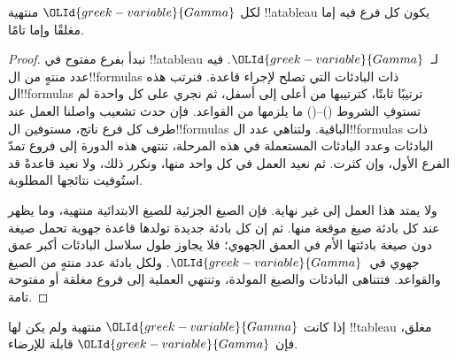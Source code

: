 \documentclass[../../../include/open-logic-section]{subfiles}
\begin{document}
\begin{prop}
  لكل ${\OLId{greek-variable}{Gamma}}$ منتهية !!a{tableau} يكون كل فرع فيه إما مغلقًا وإما تامًا.
\end{prop}

\begin{proof}
  نبدأ بفرع مفتوح في !!a{tableau} لـ~${\OLId{greek-variable}{Gamma}}$.
  فيه عدد منتهٍ من ال!!{formula}s ذات البادئات التي تصلح لإجراء
  قاعدة. فنرتب هذه ال!!{formula}s ترتيبًا ثابتًا، كترتيبها من أعلى
  إلى أسفل، ثم نجري على كل واحدة لم تستوفِ الشروط ()--() ما
  يلزمها من القواعد. فإن حدث تشعيب واصلنا العمل عند طرف كل فرع
  ناتج، مستوفين ال!!{formula}s الباقية. ولتناهي عدد ال!!{formula}s
  ذات البادئات وعدد البادئات المستعملة في هذه المرحلة، تنتهي هذه
  الدورة إلى فروع تمدّ الفرع الأول، وإن كثرت. ثم نعيد العمل في كل
  واحد منها، ونكرر ذلك، ولا نعيد قاعدةً قد استُوفيت نتائجها المطلوبة.

  ولا يمتد هذا العمل إلى غير نهاية. فإن الصيغ الجزئية للصيغ الابتدائية
  منتهية، وما يظهر عند كل بادئة صيغ موقعة منها. ثم إن كل بادئة جديدة
  تولدها قاعدة جهوية تحمل صيغة دون صيغة بادئتها الأم في العمق الجهوي؛
  فلا يجاوز طول سلاسل البادئات أكبر عمق جهوي في~${\OLId{greek-variable}{Gamma}}$. ولكل بادئة
  عدد منتهٍ من الصيغ والقواعد. فتتناهى البادئات والصيغ المولدة، وتنتهي
  العملية إلى فروع مغلقة أو مفتوحة تامة.
\end{proof}

\begin{thm}[التمام]
  إذا كانت ${\OLId{greek-variable}{Gamma}}$ منتهية ولم يكن لها !!{tableau} مغلق، فإن ${\OLId{greek-variable}{Gamma}}$
  قابلة للإرضاء.
\end{thm}
\end{document}
